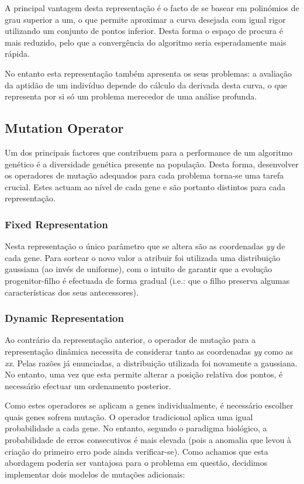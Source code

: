 \documentclass[a4paper]{article}
\begin{document}
\indent A principal vantagem desta representação é o facto de se basear em polinómios de grau superior a um, o que permite aproximar a curva desejada
com igual rigor utilizando um conjunto de pontos inferior. Desta forma o espaço de procura é mais reduzido, pelo que a convergência do algoritmo
seria esperadamente mais rápida.

\indent No entanto esta representação também apresenta os seus problemas: a avaliação da aptidão de um indivíduo depende do cálculo da derivada
desta curva, o que representa por si só um problema merecedor de uma análise profunda. 

\cleardoublepage
\subsection{Mutation Operator}
\indent \indent Um dos principais factores que contribuem para a performance de um algoritmo genético é a diversidade genética presente na população.
Desta forma, desenvolver os operadores de mutação adequados para cada problema torna-se uma tarefa crucial.
Estes actuam ao nível de cada gene e são portanto distintos para cada representação. 

\subsubsection{Fixed Representation}
\indent \indent Nesta representação o único parâmetro que se altera são as coordenadas \emph{yy} de cada gene.
Para sortear o novo valor a atribuir foi utilizada uma distribuição gaussiana (ao invés de uniforme), com o intuito 
de garantir que a evolução progenitor-filho é efectuada de forma gradual (i.e.: que o filho preserva algumas características dos
seus antecessores).

\subsubsection{Dynamic Representation}
\indent \indent Ao contrário da representação anterior, o operador de mutação para a representação dinâmica necessita de considerar
tanto as coordenadas \emph{yy} como as \emph{xx}. Pelas razões já enunciadas, a distribuição utilizada foi novamente a gaussiana.
No entanto, uma vez que esta permite alterar a posição relativa dos pontos, é necessário efectuar um ordenamento posterior.

\indent Como estes operadores se aplicam a genes individualmente, é necessário escolher quais genes sofrem mutação.
O operador tradicional aplica uma igual probabilidade a cada gene. No entanto, segundo o paradigma biológico,
a probabilidade de erros consecutivos é mais elevada (pois a anomalia que levou à criação do primeiro erro pode ainda verificar-se).
Como achamos que esta abordagem poderia ser vantajosa para o problema em questão, decidimos implementar dois modelos de mutações adicionais:
\end{document}
